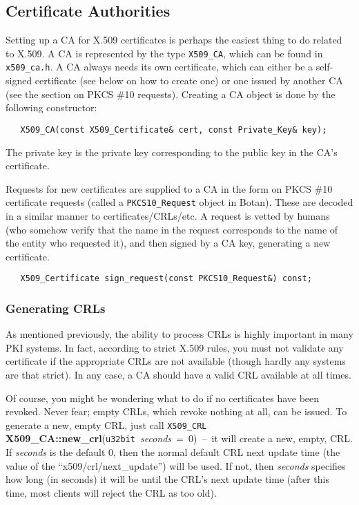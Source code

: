 \documentclass{article}
\newcommand{\filename}[1]{\texttt{#1}}
\newcommand{\function}[1]{\textbf{#1}}
\newcommand{\type}[1]{\texttt{#1}}
\renewcommand{\arg}[1]{\textsl{#1}}
\begin{document}
\subsection{Certificate Authorities}

Setting up a CA for X.509 certificates is perhaps the easiest thing to
do related to X.509. A CA is represented by the type \type{X509\_CA},
which can be found in \filename{x509\_ca.h}. A CA always needs its own
certificate, which can either be a self-signed certificate (see below
on how to create one) or one issued by another CA (see the section on
PKCS \#10 requests). Creating a CA object is done by the following
constructor:

\begin{verbatim}
   X509_CA(const X509_Certificate& cert, const Private_Key& key);
\end{verbatim}

The private key is the private key corresponding to the public key in the
CA's certificate.

Requests for new certificates are supplied to a CA in the form on PKCS
\#10 certificate requests (called a \type{PKCS10\_Request} object in
Botan). These are decoded in a similar manner to
certificates/CRLs/etc. A request is vetted by humans (who somehow
verify that the name in the request corresponds to the name of the
entity who requested it), and then signed by a CA key, generating a
new certificate.

\begin{verbatim}
   X509_Certificate sign_request(const PKCS10_Request&) const;
\end{verbatim}

\subsubsection{Generating CRLs}

As mentioned previously, the ability to process CRLs is highly important in
many PKI systems. In fact, according to strict X.509 rules, you must not
validate any certificate if the appropriate CRLs are not available (though
hardly any systems are that strict). In any case, a CA should have a valid CRL
available at all times.

Of course, you might be wondering what to do if no certificates have
been revoked. Never fear; empty CRLs, which revoke nothing at all, can
be issued. To generate a new, empty CRL, just call \type{X509\_CRL}
\function{X509\_CA::new\_crl}(\type{u32bit}~\arg{seconds}~=~0)~--~it
will create a new, empty, CRL. If \arg{seconds} is the default 0, then
the normal default CRL next update time (the value of the
``x509/crl/next\_update'') will be used. If not, then \arg{seconds}
specifies how long (in seconds) it will be until the CRL's next update
time (after this time, most clients will reject the CRL as too old).
\end{document}
